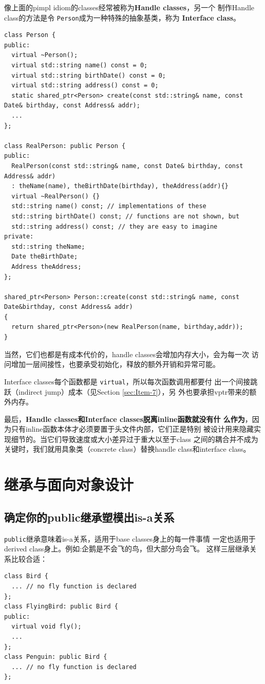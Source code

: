 \documentclass[a4paper,twoside]{article}
\theoremstyle{definition}
\theoremstyle{remark}
\numberwithin{equation}{section}
\let\OldTexttt\texttt
\renewcommand{\texttt}[1]{{\color{blue} \OldTexttt{#1}}}
\begin{document}
像上面的pimpl idiom的classes经常被称为\textbf{Handle classes}，另一个
制作Handle class的方法是令\texttt{Person}成为一种特殊的抽象基类，称为
\textbf{Interface class}。
\begin{verbatim}
class Person {
public:
  virtual ~Person();
  virtual std::string name() const = 0;
  virtual std::string birthDate() const = 0;
  virtual std::string address() const = 0;
  static shared_ptr<Person> create(const std::string& name, const Date& birthday, const Address& addr); 
  ...
};

class RealPerson: public Person {
public:
  RealPerson(const std::string& name, const Date& birthday, const Address& addr)
  : theName(name), theBirthDate(birthday), theAddress(addr){}
  virtual ~RealPerson() {}
  std::string name() const; // implementations of these
  std::string birthDate() const; // functions are not shown, but
  std::string address() const; // they are easy to imagine
private:
  std::string theName;
  Date theBirthDate;
  Address theAddress;
};

shared_ptr<Person> Person::create(const std::string& name, const Date&birthday, const Address& addr)
{
  return shared_ptr<Person>(new RealPerson(name, birthday,addr));
}
\end{verbatim}

当然，它们也都是有成本代价的，handle classes会增加内存大小，会为每一次
访问增加一层间接性，也要承受初始化，释放的额外开销和异常可能。

Interface classes每个函数都是\texttt{virtual}，所以每次函数调用都要付
出一个间接跳跃（indirect jump）成本（见Section \ref{sec:Item-7}），另
外也要承担vptr带来的额外内存。

最后，\textbf{Handle classes和Interface classes脱离inline函数就没有什
  么作为}，因为只有inline函数本体才必须要置于头文件内部，它们正是特别
被设计用来隐藏实现细节的。当它们导致速度或大小差异过于重大以至于class
之间的耦合并不成为关键时，我们就用具象类（concrete class）替换handle
class和interface class。

\clearpage
\section{继承与面向对象设计}

\subsection{确定你的public继承塑模出is-a关系}
\label{sec:Item-32}

\texttt{public}继承意味着is-a关系，适用于base classes身上的每一件事情
一定也适用于derived class身上。例如:企鹅是不会飞的鸟，但大部分鸟会飞。
这样三层继承关系比较合适：
\begin{verbatim}
class Bird {
  ... // no fly function is declared
};
class FlyingBird: public Bird {
public:
  virtual void fly();
  ...
};
class Penguin: public Bird {
  ... // no fly function is declared
};
\end{verbatim}
\end{document}
